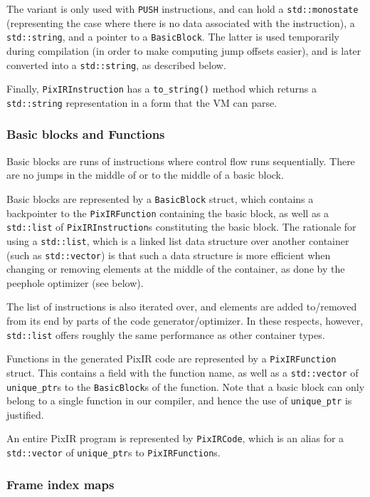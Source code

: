 \documentclass[11pt,a4paper]{scrartcl}
\begin{document}
The variant is only used with \verb|PUSH| instructions, and can hold a \verb|std::monostate| (representing the case where there is no data associated with the instruction), a \verb|std::string|, and a pointer to a \verb|BasicBlock|. The latter is used temporarily during compilation (in order to make computing jump offsets easier), and is later converted into a \verb|std::string|, as described below.

Finally, \verb|PixIRInstruction| has a \verb|to_string()| method which returns a \verb|std::string| representation in a form that the VM can parse.

\subsubsection{Basic blocks and Functions}

Basic blocks are runs of instructions where control flow runs sequentially. There are no jumps in the middle of or to the middle of a basic block.

Basic blocks are represented by a \verb|BasicBlock| struct, which contains a backpointer to the \verb|PixIRFunction| containing the basic block, as well as a \verb|std::list| of \verb|PixIRInstruction|s constituting the basic block. The rationale for using a \verb|std::list|, which is a linked list data structure over another container (such as \verb|std::vector|) is that such a data structure is more efficient when changing or removing elements at the middle of the container, as done by the peephole optimizer (see below).

The list of instructions is also iterated over, and elements are added to/removed from its end by parts of the code generator/optimizer. In these respects, however, \verb|std::list| offers roughly the same performance as other container types.

Functions in the generated PixIR code are represented by a \verb|PixIRFunction| struct. This contains a field with the function name, as well as a \verb|std::vector| of \verb|unique_ptr|s to the \verb|BasicBlock|s of the function. Note that a basic block can only belong to a single function in our compiler, and hence the use of \verb|unique_ptr| is justified.

An entire PixIR program is represented by \verb|PixIRCode|, which is an alias for a \verb|std::vector| of \verb|unique_ptr|s to \verb|PixIRFunction|s.

\subsubsection{Frame index maps}
\end{document}
